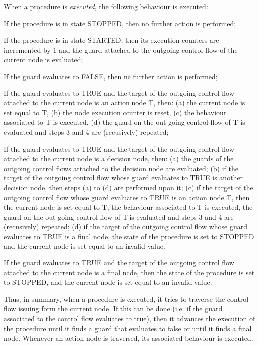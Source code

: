 \documentclass[a4paper,10pt]{article}
\newenvironment{fw_enumerate}					%
{\begin{enumerate}
  \setlength{\itemsep}{1mm}
  \setlength{\parskip}{0pt}
  \setlength{\parsep}{0pt}}
{\end{enumerate}}
\begin{document}
When a procedure is \emph{executed}, the following behaviour is executed:
\begin{fw_enumerate}
\item If the procedure is in state STOPPED, then no further action is performed;
\item If the procedure is in state STARTED, then its execution counters are incremented
by 1 and the guard attached to the outgoing control flow of the current node is evaluated;
\item If the guard evaluates to FALSE, then no further action is performed;
\item If the guard evaluates to TRUE and the target of the outgoing control flow attached to
the current node is an action node T, then: (a) the current node is set equal to T, (b) the
node execution counter is reset, (c) the
behaviour associated to T is executed, (d) the guard on the out-going control flow of T is evaluated
and steps 3 and 4 are (recusively) repeated;
\item If the guard evaluates to TRUE and the target of the outgoing control flow attached to
the current node is a decision node, then: (a) the guards of the outgoing control flows
attached to the decision node are evaluated; (b) if the target of the outgoing control
flow whose guard evaluates to TRUE is another decision node, then steps (a) to (d) are
performed upon it; (c) if the target of the outgoing control flow whose guard evaluates
to TRUE is an action node T, then the current node is set equal to T, the behaviour
associated to T is executed, the guard on the out-going control flow of T is evaluated
and steps 3 and 4 are (recusively) repeated; (d) if the target of the
outgoing control flow whose guard evaluates to TRUE is a final node, the state of the
procedure is set to STOPPED and the current node is set equal to an invalid value.
\item If the guard evaluates to TRUE and the target of the outgoing control flow attached to
the current node is a final node, then the state of the procedure is set to STOPPED,
and the current node is set equal to an invalid value.
\end{fw_enumerate}

Thus, in summary, when a procedure is executed, it tries to traverse the control flow issuing
form the current node. If this can be done (i.e. if the guard associated to the control flow
evaluates to true), then it advances the execution of the procedure until it finds a guard that
evaluates to false or until it finds a final node. Whenever an action node is traversed, its
associated behaviour is executed.
\end{document}
